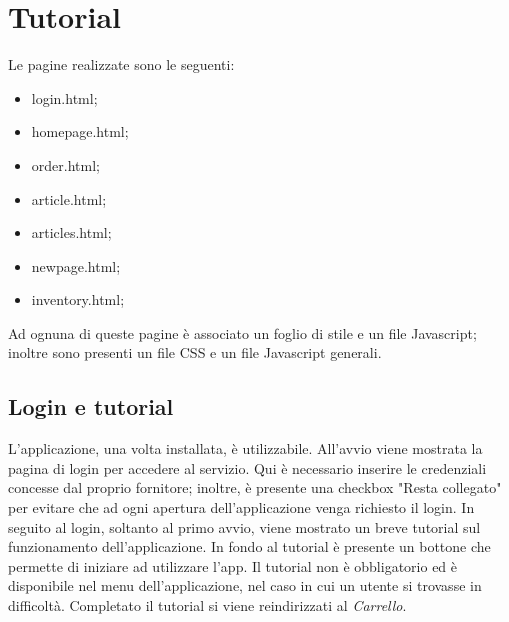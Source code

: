\documentclass[12pt, a4paper, titlepage]{report}
\begin{document}
	\section{Tutorial}
	Le pagine realizzate sono le seguenti:
	\begin{itemize}
		\item login.html;
		\item homepage.html;
		\item order.html;
		\item article.html;
		\item articles.html;
		\item newpage.html;
		\item inventory.html;
	\end{itemize}
	Ad ognuna di queste pagine è associato un foglio di stile e un file Javascript; inoltre sono presenti un file CSS e un file Javascript generali.
	
	\subsection{Login e tutorial}
	
	L'applicazione, una volta installata, è utilizzabile. All'avvio viene mostrata la pagina di login per accedere al servizio. Qui è necessario inserire le credenziali concesse dal proprio fornitore; inoltre, è presente una checkbox "Resta collegato" per evitare che ad ogni apertura dell'applicazione venga richiesto il login. In seguito al login, soltanto al primo avvio, viene mostrato un breve tutorial sul funzionamento dell'applicazione. In fondo al tutorial è presente un bottone che permette di iniziare ad utilizzare l'app. Il tutorial non è obbligatorio ed è disponibile nel menu dell'applicazione, nel caso in cui un utente si trovasse in difficoltà. Completato il tutorial si viene reindirizzati al \textit{Carrello}.
	
\end{document}
